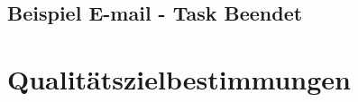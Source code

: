 \documentclass[a4paper,12pt]{article}
\begin{document}
\subsection {Beispiel E-mail - Task Beendet}
\begin{center}
\end{center}
\clearpage

\section{Qualitätszielbestimmungen}

\end{document}
